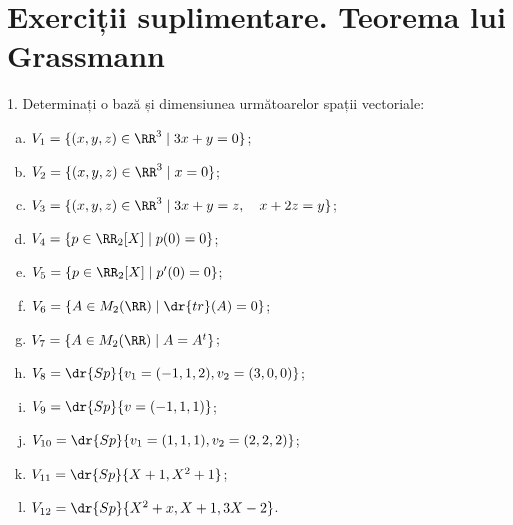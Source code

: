\section{Exerciții suplimentare. Teorema lui Grassmann}

1. Determinați o bază și dimensiunea următoarelor spații vectoriale:
\begin{enumerate}[(a)]
\item $ V_1 = \{ (x, y, z) \in \RR^3 \mid 3x + y = 0 \} $;
\item $ V_2 = \{ (x, y, z) \in \RR^3 \mid x = 0 \} $;
\item $ V_3 = \{ (x, y, z) \in \RR^3 \mid 3x + y = z, \quad x + 2z = y \} $;
\item $ V_4 = \{ p \in \RR_2[X] \mid p(0) = 0 \} $;
\item $ V_5 = \{ p \in \RR_2 [X] \mid p'(0) = 0 \} $;
\item $ V_6 = \{ A \in M_2(\RR) \mid \dr{tr}(A) = 0 \} $;
\item $ V_7 = \{ A \in M_2(\RR) \mid A = A^t \} $;
\item $ V_8 = \dr{Sp}\{ v_1 = (-1, 1, 2), v_2 = (3, 0, 0) \} $;
\item $ V_9 = \dr{Sp}\{ v = (-1, 1, 1) \} $;
\item $ V_{10} = \dr{Sp} \{ v_1 = (1, 1, 1), v_2 = (2, 2, 2) \} $;
\item $ V_{11} = \dr{Sp} \{ X + 1, X^2 + 1 \}$;
\item $ V_{12} = \dr{Sp} \{ X^2 + x, X + 1, 3X - 2 \} $.
\end{enumerate}

\vspace{1cm}

